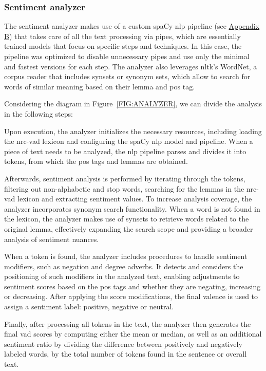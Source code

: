 \subsubsection{Sentiment analyzer\label{SSS:DATASET_SA}}

The sentiment analyzer makes use of a custom spaCy \acs{nlp} pipeline (see \hyperref[FIG:SPACY]{Appendix B}) that takes care of all the text processing via pipes, which are essentially trained models that focus on specific steps and techniques. In this case, the pipeline was optimized to disable unnecessary pipes and use only the minimal and fastest versions for each step. The analyzer also leverages \acs{nltk}'s WordNet, a corpus reader that includes synsets or synonym sets, which allow to search for words of similar meaning based on their lemma and \acs{pos} tag.

Considering the diagram in Figure~\ref{FIG:ANALYZER}, we can divide the analysis in the following steps:

\begin{compactenum}[\bfseries 1.]
    \item Upon execution, the analyzer initializes the necessary resources, including loading the \acs{nrc}-\acs{vad} lexicon and configuring the spaCy \acs{nlp} model and pipeline. When a piece of text needs to be analyzed, the \acs{nlp} pipeline parses and divides it into tokens, from which the \acs{pos} tags and lemmas are obtained. 

    \item Afterwards, sentiment analysis is performed by iterating through the tokens, filtering out non-alphabetic and stop words, searching for the lemmas in the \acs{nrc}-\acs{vad} lexicon and extracting sentiment values. To increase analysis coverage, the analyzer incorporates synonym search functionality. When a word is not found in the lexicon, the analyzer makes use of synsets to retrieve words related to the original lemma, effectively expanding the search scope and providing a broader analysis of sentiment nuances.

    \item When a token is found, the analyzer includes procedures to handle sentiment modifiers, such as negation and degree adverbs. It detects and considers the positioning of such modifiers in the analyzed text, enabling adjustments to sentiment scores based on the \acs{pos} tags and whether they are negating, increasing or decreasing. After applying the score modifications, the final valence is used to assign a sentiment label: positive, negative or neutral.

    \item Finally, after processing all tokens in the text, the analyzer then generates the final \acs{vad} scores by computing either the mean or median, as well as an additional sentiment ratio by dividing the difference between positively and negatively labeled words, by the total number of tokens found in the sentence or overall text.
\end{compactenum}

